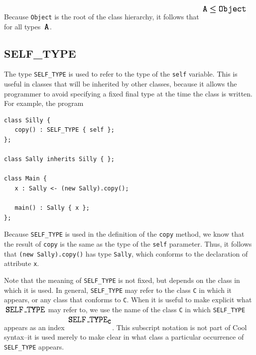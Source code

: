 \documentclass[]{article}
\begin{document}
Because \texttt{Object} is the root of the class hierarchy, it follows
that \includegraphics{img7.png} for all types
\includegraphics{img8.png}.

\subsection{SELF\_TYPE}

The type \texttt{SELF\_TYPE} is used to refer to the type of the
\texttt{self} variable. This is useful in classes that will be inherited
by other classes, because it allows the programmer to avoid specifying a
fixed final type at the time the class is written. For example, the
program

\begin{verbatim}
class Silly {
   copy() : SELF_TYPE { self };
};

class Sally inherits Silly { };

class Main {
   x : Sally <- (new Sally).copy();

   main() : Sally { x };
};
\end{verbatim}

Because \texttt{SELF\_TYPE} is used in the definition of the
\texttt{copy} method, we know that the result of \texttt{copy} is the
same as the type of the \texttt{self} parameter. Thus, it follows that
\texttt{(new Sally).copy()} has type \texttt{Sally}, which conforms to
the declaration of attribute \texttt{x}.

Note that the meaning of \texttt{SELF\_TYPE} is not fixed, but depends
on the class in which it is used. In general, \texttt{SELF\_TYPE} may
refer to the class \texttt{C} in which it appears, or any class that
conforms to \texttt{C}. When it is useful to make explicit what
\includegraphics{img9.png} may refer to, we use the name of the class
\texttt{C} in which \texttt{SELF\_TYPE} appears as an index
\includegraphics{img10.png}. This subscript notation is not part of Cool
syntax--it is used merely to make clear in what class a particular
occurrence of \texttt{SELF\_TYPE} appears.
\end{document}
